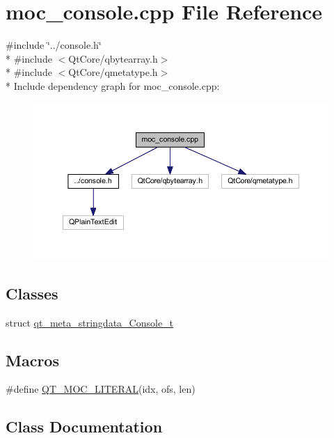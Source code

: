 \hypertarget{a00013}{\section{moc\+\_\+console.\+cpp File Reference}
\label{a00013}
}
{\ttfamily \#include \char`\"{}../console.\+h\char`\"{}}\\*
{\ttfamily \#include $<$Qt\+Core/qbytearray.\+h$>$}\\*
{\ttfamily \#include $<$Qt\+Core/qmetatype.\+h$>$}\\*
Include dependency graph for moc\+\_\+console.\+cpp\+:
\nopagebreak
\begin{figure}[H]
\begin{center}
\leavevmode
\includegraphics[width=350pt]{de/db9/a00159}
\end{center}
\end{figure}
\subsection*{Classes}
\begin{DoxyCompactItemize}
\item 
struct \hyperlink{a00013_dc/d54/a00094}{qt\+\_\+meta\+\_\+stringdata\+\_\+\+Console\+\_\+t}
\end{DoxyCompactItemize}
\subsection*{Macros}
\begin{DoxyCompactItemize}
\item 
\#define \hyperlink{a00013_a75bb9482d242cde0a06c9dbdc6b83abe}{Q\+T\+\_\+\+M\+O\+C\+\_\+\+L\+I\+T\+E\+R\+A\+L}(idx, ofs, len)
\end{DoxyCompactItemize}


\subsection{Class Documentation}
\label{dc/d54/a00094}
\hypertarget{a00013_dc/d54/a00094}{}
